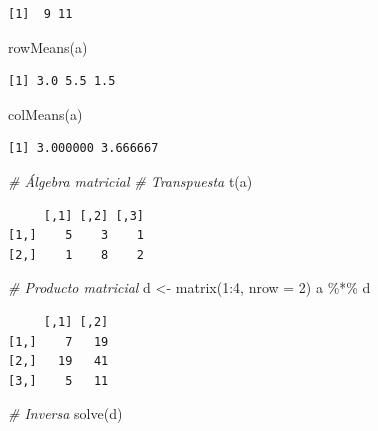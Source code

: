 \documentclass[
]{book}
\newenvironment{Shaded}{\begin{snugshade}}{\end{snugshade}}
\newcommand{\AttributeTok}[1]{\textcolor[rgb]{0.77,0.63,0.00}{#1}}
\newcommand{\CommentTok}[1]{\textcolor[rgb]{0.56,0.35,0.01}{\textit{#1}}}
\newcommand{\DecValTok}[1]{\textcolor[rgb]{0.00,0.00,0.81}{#1}}
\newcommand{\FunctionTok}[1]{\textcolor[rgb]{0.00,0.00,0.00}{#1}}
\newcommand{\NormalTok}[1]{#1}
\newcommand{\OtherTok}[1]{\textcolor[rgb]{0.56,0.35,0.01}{#1}}
\newcommand{\SpecialCharTok}[1]{\textcolor[rgb]{0.00,0.00,0.00}{#1}}
\begin{document}
\begin{verbatim}
[1]  9 11
\end{verbatim}

\begin{Shaded}
\begin{Highlighting}[]
\FunctionTok{rowMeans}\NormalTok{(a)}
\end{Highlighting}
\end{Shaded}

\begin{verbatim}
[1] 3.0 5.5 1.5
\end{verbatim}

\begin{Shaded}
\begin{Highlighting}[]
\FunctionTok{colMeans}\NormalTok{(a)}
\end{Highlighting}
\end{Shaded}

\begin{verbatim}
[1] 3.000000 3.666667
\end{verbatim}

\begin{Shaded}
\begin{Highlighting}[]
\CommentTok{\# Álgebra matricial}
\CommentTok{\# Transpuesta}
\FunctionTok{t}\NormalTok{(a)}
\end{Highlighting}
\end{Shaded}

\begin{verbatim}
     [,1] [,2] [,3]
[1,]    5    3    1
[2,]    1    8    2
\end{verbatim}

\begin{Shaded}
\begin{Highlighting}[]
\CommentTok{\# Producto matricial}
\NormalTok{d }\OtherTok{\textless{}{-}} \FunctionTok{matrix}\NormalTok{(}\DecValTok{1}\SpecialCharTok{:}\DecValTok{4}\NormalTok{, }\AttributeTok{nrow =} \DecValTok{2}\NormalTok{)}
\NormalTok{a }\SpecialCharTok{\%*\%}\NormalTok{ d}
\end{Highlighting}
\end{Shaded}

\begin{verbatim}
     [,1] [,2]
[1,]    7   19
[2,]   19   41
[3,]    5   11
\end{verbatim}

\begin{Shaded}
\begin{Highlighting}[]
\CommentTok{\# Inversa}
\FunctionTok{solve}\NormalTok{(d)}
\end{Highlighting}
\end{Shaded}
\end{document}
